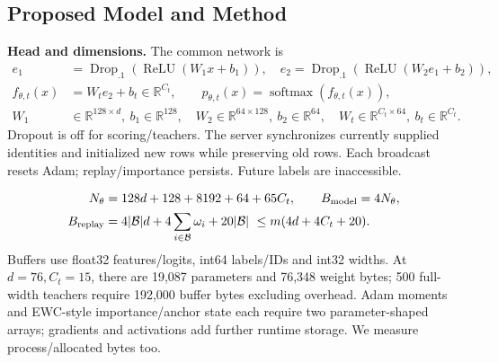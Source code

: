 \documentclass[10pt,a4paper]{article}
\begin{document}
\subsection{Proposed Model and Method}
\textbf{Head and dimensions.} The common network is
\begin{equation}
\begin{aligned}
e_1&=\operatorname{Drop}_{.1}(\operatorname{ReLU}(W_1x+b_1)),\quad
e_2=\operatorname{Drop}_{.1}(\operatorname{ReLU}(W_2e_1+b_2)),\\
f_{\theta,t}(x)&=W_te_2+b_t\in\mathbb R^{C_t},\qquad
p_{\theta,t}(x)=\operatorname{softmax}(f_{\theta,t}(x)),\\
W_1&\in\mathbb R^{128\times d},\ b_1\in\mathbb R^{128},\quad
W_2\in\mathbb R^{64\times128},\ b_2\in\mathbb R^{64},\quad
W_t\in\mathbb R^{C_t\times64},\ b_t\in\mathbb R^{C_t}.
\end{aligned}
\label{eq:head}
\end{equation}
Dropout is off for scoring/teachers. The server synchronizes currently supplied identities and initialized new rows while preserving old rows. Each broadcast resets Adam; replay/importance persists. Future labels are inaccessible.

\begin{equation}
\begin{aligned}
N_\theta&=128d+128+8192+64+65C_t,\qquad B_{\rm model}=4N_\theta,\\
B_{\rm replay}&=4|\mathcal B|d+4\sum_{i\in\mathcal B}\omega_i+20|\mathcal B|\ \le m(4d+4C_t+20).
\end{aligned}
\label{eq:bytes}
\end{equation}
Buffers use float32 features/logits, int64 labels/IDs and int32 widths. At $d=76,C_t=15$, there are 19,087 parameters and 76,348 weight bytes; 500 full-width teachers require 192,000 buffer bytes excluding overhead. Adam moments and EWC-style importance/anchor state each require two parameter-shaped arrays; gradients and activations add further runtime storage. We measure process/allocated bytes too.
\end{document}
